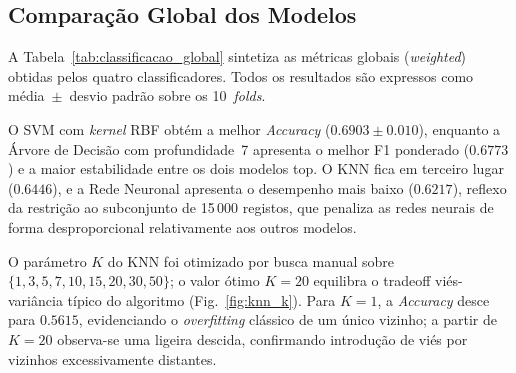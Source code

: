 \documentclass[conference]{IEEEtran}
\begin{document}
\subsection{Compara\c{c}\~ao Global dos Modelos}
 
A Tabela~\ref{tab:classificacao_global} sintetiza as m\'etricas globais
(\textit{weighted}) obtidas pelos quatro classificadores. Todos os
resultados s\~ao expressos como m\'edia~$\pm$~desvio padr\~ao sobre os
10~\textit{folds}.
 
\begin{table}[htbp]
\caption{Desempenho Global dos Modelos de Classifica\c{c}\~ao\\
(10-\textit{fold} CV, m\'etricas \textit{weighted})}
\label{tab:classificacao_global}
\centering
\renewcommand{\arraystretch}{1.2}
\end{table}
 
O SVM com \textit{kernel} RBF obt\'em a melhor \textit{Accuracy}
($0.6903 \pm 0.010$), enquanto a \'Arvore de Decis\~ao com profundidade~7
apresenta o melhor F1 ponderado ($0.6773$) e a maior estabilidade entre
os dois modelos top. O KNN fica em terceiro lugar ($0.6446$), e a Rede
Neuronal apresenta o desempenho mais baixo ($0.6217$), reflexo da
restri\c{c}\~ao ao subconjunto de 15\,000 registos, que penaliza as redes
neurais de forma desproporcional relativamente aos outros modelos.
 
O par\'ametro $K$ do KNN foi otimizado por busca manual sobre
$\{1,3,5,7,10,15,20,30,50\}$; o valor \'otimo $K=20$ equilibra o
tradeoff vi\'es-vari\^ancia t\'ipico do algoritmo (Fig.~\ref{fig:knn_k}).
Para $K=1$, a \textit{Accuracy} desce para $0.5615$, evidenciando o
\textit{overfitting} cl\'assico de um \'unico vizinho; a partir de $K=20$
observa-se uma ligeira descida, confirmando introdução de vi\'es por
vizinhos excessivamente distantes.
 
\end{document}
